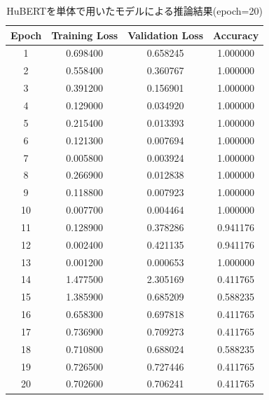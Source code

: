 \documentclass[10pt]{ltjsarticle}
\begin{document}
\begin{table}[h]
\centering
\caption{HuBERTを単体で用いたモデルによる推論結果(epoch=20)}
\begin{tabular}{c c c c}
\hline
\textbf{Epoch} & \textbf{Training Loss} & \textbf{Validation Loss} & \textbf{Accuracy} \\
\hline
1  & 0.698400 & 0.658245 & 1.000000 \\
2  & 0.558400 & 0.360767 & 1.000000 \\
3  & 0.391200 & 0.156901 & 1.000000 \\
4  & 0.129000 & 0.034920 & 1.000000 \\
5  & 0.215400 & 0.013393 & 1.000000 \\
6  & 0.121300 & 0.007694 & 1.000000 \\
7  & 0.005800 & 0.003924 & 1.000000 \\
8  & 0.266900 & 0.012838 & 1.000000 \\
9  & 0.118800 & 0.007923 & 1.000000 \\
10 & 0.007700 & 0.004464 & 1.000000 \\
11 & 0.128900 & 0.378286 & 0.941176 \\
12 & 0.002400 & 0.421135 & 0.941176 \\
13 & 0.001200 & 0.000653 & 1.000000 \\
14 & 1.477500 & 2.305169 & 0.411765 \\
15 & 1.385900 & 0.685209 & 0.588235 \\
16 & 0.658300 & 0.697818 & 0.411765 \\
17 & 0.736900 & 0.709273 & 0.411765 \\
18 & 0.710800 & 0.688024 & 0.588235 \\
19 & 0.726500 & 0.727446 & 0.411765 \\
20 & 0.702600 & 0.706241 & 0.411765 \\
\hline
\end{tabular}
\end{table}
\end{document}
